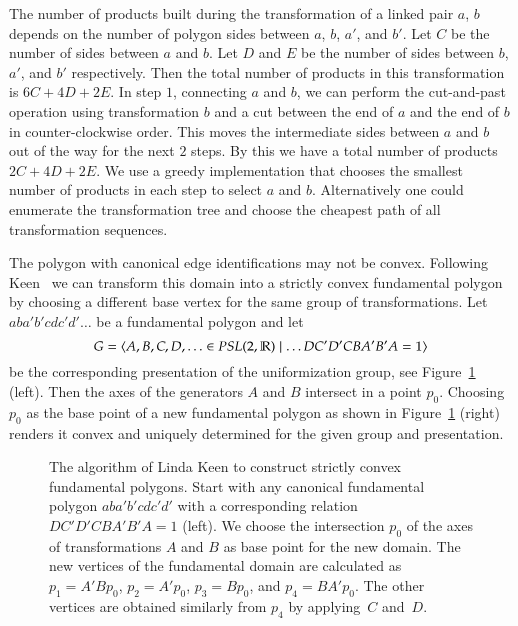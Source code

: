 \documentclass[Thesis]{subfiles}
\begin{document}
 The number of products built during the transformation of a linked pair $a$, $b$ depends on the number of polygon sides between $a$, $b$, $a'$, and $b'$. 
 Let $C$ be the number of sides between $a$ and $b$. Let $D$ and $E$ be the number of sides between $b$, $a'$, and $b'$ respectively. 
 Then the total number of products in this transformation is $6C+4D+2E$. 
 In step $1$, connecting $a$ and $b$, we can perform the cut-and-past operation using transformation $b$ and a cut between the end of $a$ and the end of $b$ in counter-clockwise order. 
 This moves the intermediate sides between $a$ and $b$ out of the way for the next $2$ steps. 
 By this we have a total number of products $2C+4D+2E$. 
 We use a greedy implementation that chooses the smallest number of products in each step to select $a$ and $b$.
 Alternatively one could enumerate the transformation tree and choose the cheapest path of all transformation sequences.


The polygon with canonical edge identifications may not be
convex. Following Keen~\cite{keen1966} we can transform this domain
into a strictly convex fundamental polygon by choosing a different
base vertex for the same group of transformations. Let
$aba'b'cdc'd'\ldots$ be a fundamental polygon and let
\begin{equation}
G=\left<A,B,C,D,\ldots\in \mathit{PSL}(2,\mathbb R)\mid \ldots DC'D'CBA'B'A =1\right>
\end{equation}
be the corresponding presentation of the uniformization group, see
Figure~\ref{fig:keen_polygon} (left). Then the axes of the generators
$A$ and $B$ intersect in a point $p_0$. Choosing $p_0$ as the base
point of a new fundamental polygon as shown in
Figure~\ref{fig:keen_polygon} (right) renders it convex and uniquely
determined for the given group and presentation.
\begin{figure}
\centering
{}
\caption{ The algorithm of Linda Keen to construct strictly convex
  fundamental polygons.  Start with any canonical fundamental polygon
  $aba'b'cdc'd'$ with a corresponding relation $DC'D'CBA'B'A=1$
  (left).  We choose the intersection $p_0$ of the axes of
  transformations $A$ and $B$ as base point for the new domain. The
  new vertices of the fundamental domain are calculated as
  $p_1=A'Bp_0$, $p_2=A'p_0$, $p_3=Bp_0$, and
  $p_4=BA'p_0$.  The other vertices are obtained similarly from $p_4$
  by applying~$C$ and~$D$.}
\label{fig:keen_polygon}
\end{figure}
\end{document}
